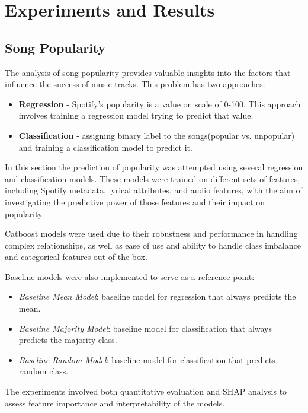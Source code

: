 \chapter{Experiments and Results}
\label{cha:experimentsandresults}

\section{Song Popularity}
\label{sec:songpopularity}

The analysis of song popularity provides valuable insights into the factors
that influence the success of music tracks. This problem has two approaches:
\begin{itemize}
  \item \textbf{Regression} - Spotify's popularity is a value on scale of
    0-100. This approach involves training a regression model trying to predict
    that value.
  \item \textbf{Classification} - assigning binary label to the songs(popular
    vs. unpopular) and training a classification model to predict it.
\end{itemize}

In this section the prediction of popularity was attempted using several
regression and classification models. These models were trained on different
sets of features, including Spotify metadata, lyrical attributes, and audio
features, with the aim of investigating the predictive power of those features
and their impact on popularity.

Catboost models were used  due to their robustness and performance in handling
complex relationships, as well as ease of use and ability to handle class
imbalance and categorical features out of the box.

Baseline models were also implemented to serve as a reference point:
\begin{itemize}
  \item \textit{Baseline Mean Model}: baseline model for regression that always
    predicts the mean.
  \item \textit{Baseline Majority Model}: baseline model for classification
    that always predicts the majority class.
  \item \textit{Baseline Random Model}: baseline model for classification that
    predicts random class.
\end{itemize}

The experiments involved both quantitative evaluation and SHAP analysis to
assess feature importance and interpretability of the models.

